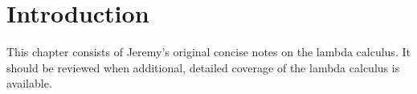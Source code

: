 \documentclass[../../../include/open-logic-chapter]{subfiles}
\begin{document}
\chapter{Introduction}

\begin{editorial}
This chapter consists of Jeremy's original concise notes on the lambda
calculus. It should be reviewed when additional, detailed coverage of
the lambda calculus is available.
\end{editorial}













\OLEndChapterHook
\end{document}
